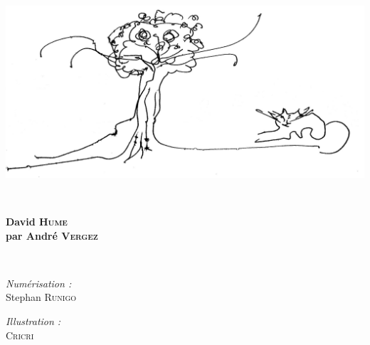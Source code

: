 \begin{titlepage}
%
~\\[1cm]

\begin{center}
\includegraphics[scale=0.9]{./presentation/arbre}
\end{center}

\textsc{\Large }\\[2.0cm]

\HRule

\begin{center}
{\huge \bfseries  David \textsc{Hume}\\
\Large par André \textsc{Vergez}\\%
 }
\end{center}

\HRule \\[2.5cm]


\begin{minipage}{0.4\textwidth}
\begin{flushleft} \large
\emph{Numérisation :}\\
Stephan \textsc{Runigo}
\end{flushleft}
\end{minipage}
\begin{minipage}{0.4\textwidth}
\begin{flushright} \large
\emph{Illustration :}\\
\textsc{Cricri}
\end{flushright}
\end{minipage}

\vfill


\end{titlepage}
